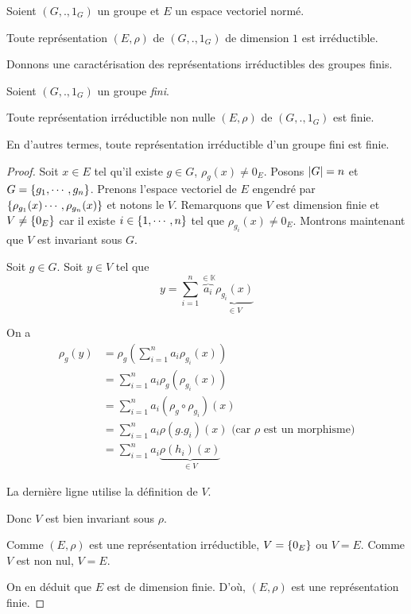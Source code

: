 \begin{remarque}
	Soient $(G, ., 1_{G})$ un groupe et $E$ un espace
	vectoriel normé.

	Toute représentation $(E, \rho)$ de $(G, ., 1_{G})$ de dimension $1$ est
	irréductible.
\end{remarque}

Donnons une caractérisation des représentations irréductibles des groupes finis.

\begin{proposition}
	\label{prop:irreductible_representation_finite_group_is_finite}
	Soient $(G, ., 1_{G})$ un groupe \textit{fini}.

	Toute représentation irréductible non nulle $(E, \rho)$ de $(G, ., 1_{G})$ est finie.

	En d'autres termes, toute représentation irréductible d'un groupe fini est finie.
\end{proposition}

\ifdefined\outputproof
\begin{proof}
	Soit $x \in E$ tel qu'il existe $g \in G$, $\rho_{g}(x) \neq 0_{E}$.
	Posons $|G| = n$ et $G = \left\{ g_{1}, \cdots, g_{n} \right\}$. Prenons
	l'espace vectoriel de $E$ engendré par $\left\{ \rho_{g_{1}}(x) \cdots,
	\rho_{g_{n}}(x) \right\}$ et notons le $V$. Remarquons que $V$ est dimension finie
	et $V \neq \left\{ 0_{E} \right\}$
	car il existe $i \in \left\{ 1, \cdots, n \right\}$ tel que $\rho_{g_{i}}(x) \neq
	0_{E}$. Montrons maintenant que $V$ est invariant
	sous $G$.

	Soit $g \in G$. Soit $y \in V$ tel que
	\begin{equation}
		y = \sum_{i = 1}^{n} \overbrace{a_{i}}^{\in \mathbb{K}}
		\underbrace{\rho_{g_{i}}(x)}_{\in V}
	\end{equation}

	On a
	\begin{align}
		\rho_{g}(y) & = \rho_{g}(\sum_{i = 1}^{n} a_{i} \rho_{g_{i}}(x)) \\
		& = \sum_{i = 1}^{n} a_{i} \rho_{g}(\rho_{g_{i}}(x)) \\
		& = \sum_{i = 1}^{n} a_{i} (\rho_{g} \circ \rho_{g_{i}})(x) \\
		& = \sum _{i = 1}^{n} a_{i} \rho(g . g_{i})(x) \text{ (car $\rho$ est un
		morphisme)}\\
		& = \sum_{i = 1}^{n} a_{i} \underbrace{\rho(h_{i})(x)}_{\in V}
	\end{align}

	La dernière ligne utilise la définition de $V$.

	Donc $V$ est bien invariant sous $\rho$.

	Comme $(E, \rho)$ est une représentation irréductible, $V = \left\{ 0_{E} \right\}$
	ou $V = E$. Comme $V$ est non nul, $V = E$.

	On en déduit que $E$ est de dimension finie. D'où, $(E,
	\rho)$ est une représentation finie.
\end{proof}
\fi

